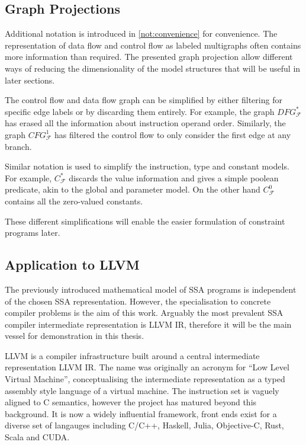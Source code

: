 \subsection{Graph Projections}

    Additional notation is introduced in \autoref{not:convenience} for
    convenience.
    The representation of data flow and control flow as labeled multigraphs
    often contains more information than required.
    The presented graph projection allow different ways of reducing the
    dimensionality of the model structures that will be useful in later
    sections.

    The control flow and data flow graph can be simplified by either filtering
    for specific edge labels or by discarding them entirely.
    For example, the graph $DFG_\mathcal F^*$ has erased all the information
    about instruction operand order.
    Similarly, the graph $CFG_\mathcal F^1$ has filtered the control flow to
    only consider the first edge at any branch.

    Similar notation is used to simplify the instruction, type and constant
    models.
    For example, $C_\mathcal F^*$ discards the value information and gives a
    simple poolean predicate, akin to the global and parameter model.
    On the other hand $C_\mathcal F^0$ contains all the zero-valued constants.

    These different simplifications will enable the easier formulation of
    constraint programs later.

\subsection{Application to LLVM}

    The previously introduced mathematical model of SSA programs is independent
    of the chosen SSA representation.
    However, the specialisation to concrete compiler problems is the aim of this
    work.
    Arguably the most prevalent SSA compiler intermediate representation is
    LLVM IR, therefore it will be the main vessel for demonstration in this
    thesis.

    LLVM is a compiler infrastructure built around a central intermediate
    representation LLVM IR.
    The name was originally an acronym for ``Low Level Virtual Machine'',
    conceptualising the intermediate representation as a typed assembly style
    language of a virtual machine.
    The instruction set is vaguely aligned to C semantics, however the project
    has matured beyond this background.
    It is now a widely influential framework, front ends exist for a diverse set
    of langauges including C/C++, Haskell, Julia, Objective-C, Rust, Scala and
    CUDA.

